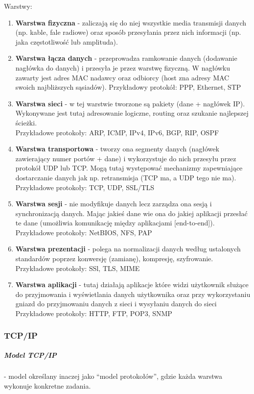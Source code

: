 \documentclass[a4paper,12pt,oneside]{book}
\begin{document}
				Warstwy:
				\begin{enumerate}
					\item \textbf{Warstwa fizyczna} - zaliczają się do niej wszystkie media transmisji danych (np.
					kable, fale radiowe) oraz sposób przesyłania przez nich informacji (np. jaka
					częstotliwość lub amplituda). 
					\item \textbf{Warstwa łącza danych} - przeprowadza ramkowanie danych (dodawanie nagłówka
					do danych) i przesyła je przez warstwę fizyczną. W nagłówku zawarty jest adres
					MAC nadawcy oraz odbiorcy (host zna adresy MAC swoich najbliższych sąsiadów).
					Przykładowy protokół: PPP, Ethernet, STP
					\item \textbf{Warstwa sieci} - w tej warstwie tworzone są pakiety (dane + nagłówek IP).
					Wykonywane jest tutaj adresowanie logiczne, routing oraz szukanie najlepszej
					ścieżki.\\
					Przykładowe protokoły: ARP, ICMP, IPv4, IPv6, BGP, RIP, OSPF
					\item \textbf{Warstwa transportowa} - tworzy ona segmenty danych (nagłówek zawierający
					numer portów + dane) i wykorzystuje do nich przesyłu przez protokół UDP lub TCP.
					Mogą tutaj występować mechanizmy zapewniające dostarczanie danych jak np.
					retransmisja (TCP ma, a UDP tego nie ma).\\
					Przykładowe protokoły: TCP, UDP, SSL/TLS
					\item \textbf{Warstwa sesji} - nie modyfikuje danych lecz zarządza ona sesją i synchronizacją
					danych. Mając jakieś dane wie ona do jakiej aplikacji przesłać te dane (umożliwia
					komunikację między aplikacjami [end-to-end]).\\
					Przykładowe protokoły: NetBIOS, NFS, PAP
					\item \textbf{Warstwa prezentacji} - polega na normalizacji danych według ustalonych
					standardów poprzez konwersję (zamianę), kompresję, szyfrowanie.\\
					Przykładowe protokoły: SSl, TLS, MIME
					\item \textbf{Warstwa aplikacji} - tutaj działają aplikacje które widzi użytkownik służące do
					przyjmowania i wyświetlania danych użytkownika oraz przy wykorzystaniu gniazd do
					przyjmowaniu danych z sieci i wysyłaniu danych do sieci\\
					Przykładowe protokoły: HTTP, FTP, POP3, SNMP
				\end{enumerate}
			
			\subsubsection{TCP/IP}
			\subparagraph{Model TCP/IP}- model określany inaczej jako “model protokołów”, gdzie każda warstwa
			wykonuje konkretne zadania.
			
\end{document}
